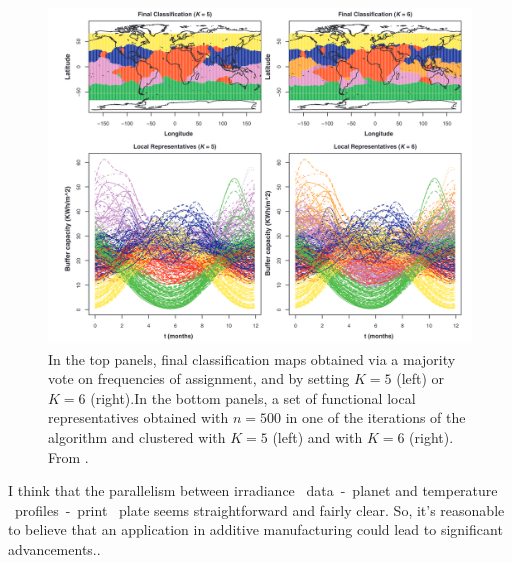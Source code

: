 \begin{figure}
    \centering
    \includegraphics[scale=0.4]{Images/resbagging.png}
    \caption[Classification of irradiance data.]{In the top panels, final classification maps obtained via a majority vote on frequencies of assignment, and by setting $K = 5$ (left) or $K = 6$ (right).In the bottom panels, a set of functional local representatives obtained with $n = 500$ in one of the iterations of the algorithm and clustered with $K = 5$ (left) and with $K=6$ (right). From \citeauthor{secchi_bagging_2013} \citeyear{secchi_bagging_2013}.}
    \label{fig:resbagging}
\end{figure}
I think that the parallelism between irradiance ~data~-~planet and temperature ~profiles~-~print ~plate seems straightforward and fairly clear. So, it's reasonable to believe that an application in additive manufacturing could lead to significant advancements..
